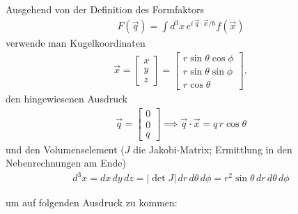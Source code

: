 \documentclass[11pt,a4paper]{scrartcl}
\begin{document}
\begin{enumerate}[label=(\alph*)]
    \begin{tcolorbox}[title=Berechnung, breakable]
        Ausgehend von der Definition des Formfaktors
        \begin{align*}
            F(\vec{q}) = \int d^3x \, e^{i \, \vec{q} \cdot \vec{x}/\hbar} f(\vec{x})
        \end{align*}
        verwende man Kugelkoordinaten
        \begin{align*}
            \vec{x} = \begin{bmatrix}
                x\\y\\z
            \end{bmatrix}=\begin{bmatrix}
                r \sin{\theta} \cos{\phi}\\
                r \sin{\theta} \sin{\phi}\\
                r \cos{\theta}
            \end{bmatrix},              
        \end{align*}
        den hingewiesenen Ausdruck
        \begin{align*}
            \vec{q} = \begin{bmatrix}
                0\\0\\q
            \end{bmatrix} \implies \vec{q} \cdot \vec{x} = q \, r \cos{\theta}
        \end{align*}
        und den Volumenselement ($J$ die Jakobi-Matrix; Ermittlung in den Nebenrechnungen am Ende)
        \begin{align*}
            d^3x = dx\,dy\,dz = |\det{J}|\,dr\,d\theta\,d\phi = r^2 \sin{\theta}\, dr\, d\theta \, d\phi
        \end{align*}

        um auf folgenden Ausdruck zu kommen:


\end{tcolorbox}
\end{enumerate}
\end{document}
